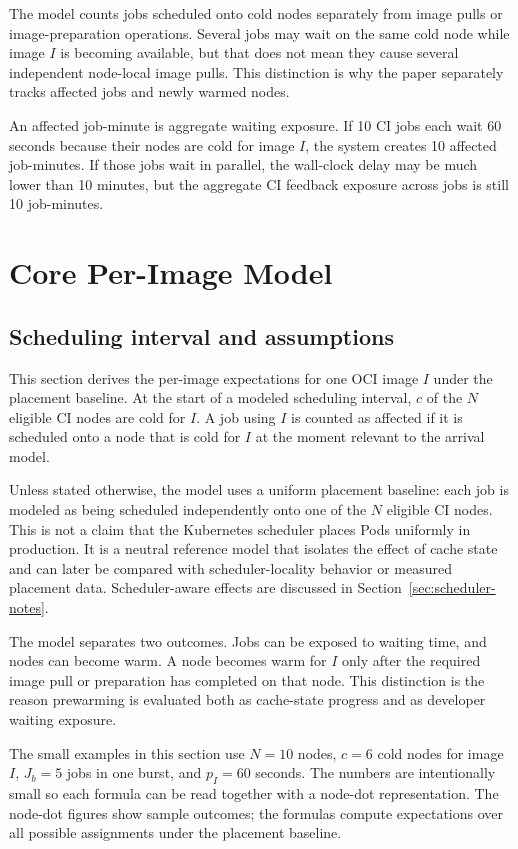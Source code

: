 \documentclass[11pt,a4paper]{article}
\begin{document}
The model counts jobs scheduled onto cold nodes separately from image pulls or image-preparation operations. Several jobs may wait on the same cold node while image \(I\) is becoming available, but that does not mean they cause several independent node-local image pulls. This distinction is why the paper separately tracks affected jobs and newly warmed nodes.

An affected job-minute is aggregate waiting exposure. If 10 CI jobs each wait 60 seconds because their nodes are cold for image \(I\), the system creates 10 affected job-minutes. If those jobs wait in parallel, the wall-clock delay may be much lower than 10 minutes, but the aggregate CI feedback exposure across jobs is still 10 job-minutes.


\section{Core Per-Image Model}\label{sec:core-model}

\subsection{Scheduling interval and assumptions}

This section derives the per-image expectations for one OCI image \(I\) under the placement baseline. At the start of a modeled scheduling interval, \(c\) of the \(N\) eligible CI nodes are cold for \(I\). A job using \(I\) is counted as affected if it is scheduled onto a node that is cold for \(I\) at the moment relevant to the arrival model.

Unless stated otherwise, the model uses a uniform placement baseline: each job is modeled as being scheduled independently onto one of the \(N\) eligible CI nodes. This is not a claim that the Kubernetes scheduler places Pods uniformly in production. It is a neutral reference model that isolates the effect of cache state and can later be compared with scheduler-locality behavior or measured placement data. Scheduler-aware effects are discussed in Section~\ref{sec:scheduler-notes}.

The model separates two outcomes. Jobs can be exposed to waiting time, and nodes can become warm. A node becomes warm for \(I\) only after the required image pull or preparation has completed on that node. This distinction is the reason prewarming is evaluated both as cache-state progress and as developer waiting exposure.

The small examples in this section use \(N=10\) nodes, \(c=6\) cold nodes for image \(I\), \(J_b=5\) jobs in one burst, and \(p_I=60\) seconds. The numbers are intentionally small so each formula can be read together with a node-dot representation. The node-dot figures show sample outcomes; the formulas compute expectations over all possible assignments under the placement baseline.
\end{document}
